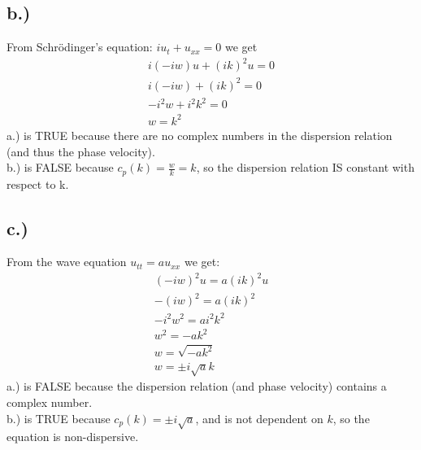 \documentclass{article}
\begin{document}
\subsection*{b.)}
From Schr\"odinger's equation: $iu_t + u_{xx} = 0$ we get
\begin{equation}
\begin{aligned}
i(-iw)u + (ik)^2u = 0\\
i(-iw) + (ik)^2 = 0\\
-i^2w + i^2k^2 = 0\\
w = k^2
\end{aligned}
\end{equation}
a.) is TRUE because there are no complex numbers in the dispersion relation (and thus the phase velocity).\\
b.) is FALSE because $c_p(k) = \frac{w}{k} = k$, so the dispersion relation IS constant with respect to k.
\subsection*{c.)}
From the wave equation $u_{tt} = au_{xx}$ we get:
\begin{equation}
\begin{aligned}
(-iw)^2u = a(ik)^2u\\
-(iw)^2 = a(ik)^2\\
-i^2w^2 = ai^2k^2\\
w^2 = -ak^2\\
w = \sqrt{-ak^2}\\
w = \pm i\sqrt{a}k
\end{aligned}
\end{equation}
a.) is FALSE because the dispersion relation (and phase velocity) contains a complex number.\\
b.) is TRUE because $c_p(k) = \pm i\sqrt{a}$, and is not dependent on $k$, so the equation is non-dispersive.
\end{document}
